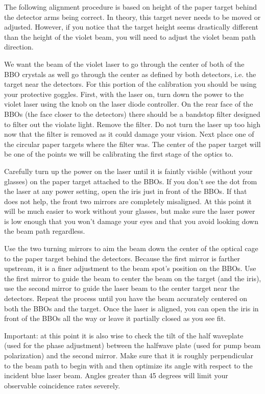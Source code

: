 \documentclass{../lab}
\begin{document}
The following alignment procedure is based on height of the paper target behind the detector arms being correct. In theory, this target never needs to be moved or adjusted. However, if you notice that the target height seems drastically different than the height of the violet beam, you will need to adjust the violet beam path direction.

We want the beam of the violet laser to go through the center of both of the BBO crystals as well go through the center as defined by both detectors, i.e. the target near the detectors. For this portion of the calibration you should be using your protective goggles. First, with the laser on, turn down the power to the violet laser using the knob on the laser diode controller. On the rear face of the BBOs (the face closer to the detectors) there should be a bandstop filter designed to filter out the violate light. Remove the filter. Do not turn the laser up too high now that the filter is removed as it could damage your vision. Next place one of the circular paper targets where the filter was. The center of the paper target will be one of the points we will be calibrating the first stage of the optics to.

Carefully turn up the power on the laser until it is faintly visible (without your glasses) on the paper target attached to the BBOs. If you don't see the dot from the laser at any power setting, open the iris just in front of the BBOs. If that does not help, the front two mirrors are completely misaligned. At this point it will be much easier to work without your glasses, but make sure the laser power is low enough that you won't damage your eyes and that you avoid looking down the beam path regardless.

Use the two turning mirrors to aim the beam down the center of the optical cage to the paper target behind the detectors. Because the first mirror is farther upstream, it is a finer adjustment to the beam spot's position on the BBOs. Use the first mirror to guide the beam to center the beam on the target (and the iris), use the second mirror to guide the laser beam to the center target near the detectors. Repeat the process until you have the beam accurately centered on both the BBOs and the target. Once the laser is aligned, you can open the iris in front of the BBOs all the way or leave it partially closed as you see fit.

Important: at this point it is also wise to check the tilt of the half waveplate (used for the phase adjustment) between the halfwave plate (used for pump beam polarization) and the second mirror. Make sure that it is roughly perpendicular to the beam path to begin with and then optimize its angle with respect to the incident blue laser beam. Angles greater than 45 degrees will limit your observable coincidence rates severely.
\end{document}
